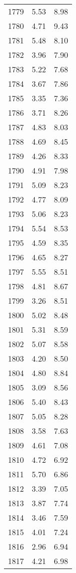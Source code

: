 \begin{tabular}{lrr}
1779 &    5.53 &    8.98 \\
1780 &    4.71 &    9.43 \\
1781 &    5.48 &    8.10 \\
1782 &    3.96 &    7.90 \\
1783 &    5.22 &    7.68 \\
1784 &    3.67 &    7.86 \\
1785 &    3.35 &    7.36 \\
1786 &    3.71 &    8.26 \\
1787 &    4.83 &    8.03 \\
1788 &    4.69 &    8.45 \\
1789 &    4.26 &    8.33 \\
1790 &    4.91 &    7.98 \\
1791 &    5.09 &    8.23 \\
1792 &    4.77 &    8.09 \\
1793 &    5.06 &    8.23 \\
1794 &    5.54 &    8.53 \\
1795 &    4.59 &    8.35 \\
1796 &    4.65 &    8.27 \\
1797 &    5.55 &    8.51 \\
1798 &    4.81 &    8.67 \\
1799 &    3.26 &    8.51 \\
1800 &    5.02 &    8.48 \\
1801 &    5.31 &    8.59 \\
1802 &    5.07 &    8.58 \\
1803 &    4.20 &    8.50 \\
1804 &    4.80 &    8.84 \\
1805 &    3.09 &    8.56 \\
1806 &    5.40 &    8.43 \\
1807 &    5.05 &    8.28 \\
1808 &    3.58 &    7.63 \\
1809 &    4.61 &    7.08 \\
1810 &    4.72 &    6.92 \\
1811 &    5.70 &    6.86 \\
1812 &    3.39 &    7.05 \\
1813 &    3.87 &    7.74 \\
1814 &    3.46 &    7.59 \\
1815 &    4.01 &    7.24 \\
1816 &    2.96 &    6.94 \\
1817 &    4.21 &    6.98 \\

\end{tabular}
